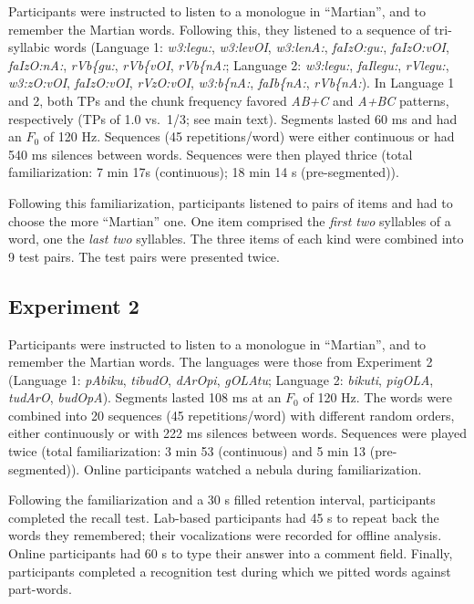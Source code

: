 \documentclass[]{article}
\begin{document}
Participants were instructed to listen to a monologue in ``Martian'', and to remember the Martian words. Following this, they listened to a sequence of tri-syllabic words (Language 1: \emph{w3:legu:}, \emph{w3:levOI}, \emph{w3:lenA:}, \emph{faIzO:gu:}, \emph{faIzO:vOI}, \emph{faIzO:nA:}, \emph{rVb\{gu:}, \emph{rVb\{vOI}, \emph{rVb\{nA:}; Language 2: \emph{w3:legu:}, \emph{faIlegu:}, \emph{rVlegu:}, \emph{w3:zO:vOI}, \emph{faIzO:vOI}, \emph{rVzO:vOI}, \emph{w3:b\{nA:}, \emph{faIb\{nA:}, \emph{rVb\{nA:}). In Language 1 and 2, both TPs and the chunk frequency favored \emph{AB+C} and \emph{A+BC} patterns, respectively (TPs of 1.0 vs.~1/3; see main text). Segments lasted 60 ms and had an \(F_0\) of 120 Hz. Sequences (45 repetitions/word) were either continuous or had 540 ms silences between words. Sequences were then played thrice (total familiarization: 7 min 17s (continuous); 18 min 14 s (pre-segmented)).

Following this familiarization, participants listened to pairs of items and had to choose the more ``Martian'' one. One item comprised the \emph{first two} syllables of a word, one the \emph{last two} syllables. The three items of each kind were combined into 9 test pairs. The test pairs were presented twice.

\subsection{Experiment 2}

Participants were instructed to listen to a monologue in ``Martian'', and to remember the Martian words. The languages were those from \citet{Saffran-Science} Experiment 2 (Language 1: \emph{pAbiku}, \emph{tibudO}, \emph{dArOpi}, \emph{gOLAtu}; Language 2: \emph{bikuti}, \emph{pigOLA}, \emph{tudArO}, \emph{budOpA}). Segments lasted 108 ms at an \(F_0\) of 120 Hz. The words were combined into 20 sequences (45 repetitions/word) with different random orders, either continuously or with 222 ms silences between words. Sequences were played twice (total familiarization: 3 min 53 (continuous) and 5 min 13 (pre-segmented)). Online participants watched a nebula during familiarization.

Following the familiarization and a 30 s filled retention interval, participants completed the recall test. Lab-based participants had 45 s to repeat back the words they remembered; their vocalizations were recorded for offline analysis. Online participants had 60 s to type their answer into a comment field. Finally, participants completed a recognition test during which we pitted words against part-words.
\end{document}
